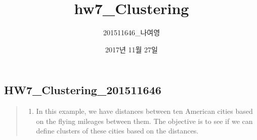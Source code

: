\documentclass[]{article}
\title{hw7\_Clustering}
\author{201511646\_나여영}
\date{2017년 11월 27일}
\providecommand{\tightlist}{%
  \setlength{\itemsep}{0pt}\setlength{\parskip}{0pt}}
\begin{document}
\maketitle

\subsection{HW7\_Clustering\_201511646}\label{hw7_clustering_201511646}

\begin{quote}
\begin{enumerate}
\def\labelenumi{\arabic{enumi}.}
\tightlist
\item
  In this example, we have distances between ten American cities based
  on the flying mileages between them. The objective is to see if we can
  define clusters of these cities based on the distances.
\end{enumerate}
\end{quote}
\end{document}
